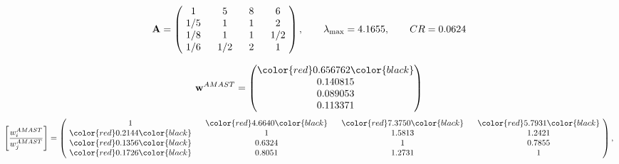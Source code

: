 \begin{example}
\begin{equation*}
\mathbf{A} =
\begin{pmatrix}
$\,\,$ 1 $\,\,$ & $\,\,$5$\,\,$ & $\,\,$8$\,\,$ & $\,\,$6 $\,\,$ \\
$\,\,$ 1/5$\,\,$ & $\,\,$ 1 $\,\,$ & $\,\,$1$\,\,$ & $\,\,$2 $\,\,$ \\
$\,\,$ 1/8$\,\,$ & $\,\,$ 1 $\,\,$ & $\,\,$ 1 $\,\,$ & $\,\,$ 1/2 $\,\,$ \\
$\,\,$ 1/6$\,\,$ & $\,\,$ 1/2$\,\,$ & $\,\,$2$\,\,$ & $\,\,$ 1  $\,\,$ \\
\end{pmatrix},
\qquad
\lambda_{\max} =
4.1655,
\qquad
CR = 0.0624
\end{equation*}

\begin{equation*}
\mathbf{w}^{AMAST} =
\begin{pmatrix}
\color{red} 0.656762\color{black} \\
0.140815\\
0.089053\\
0.113371
\end{pmatrix}\end{equation*}
\begin{equation*}
\left[ \frac{{w}^{AMAST}_i}{{w}^{AMAST}_j} \right] =
\begin{pmatrix}
$\,\,$ 1 $\,\,$ & $\,\,$\color{red} 4.6640\color{black} $\,\,$ & $\,\,$\color{red} 7.3750\color{black} $\,\,$ & $\,\,$\color{red} 5.7931\color{black} $\,\,$ \\
$\,\,$\color{red} 0.2144\color{black} $\,\,$ & $\,\,$ 1 $\,\,$ & $\,\,$1.5813$\,\,$ & $\,\,$1.2421  $\,\,$ \\
$\,\,$\color{red} 0.1356\color{black} $\,\,$ & $\,\,$0.6324$\,\,$ & $\,\,$ 1 $\,\,$ & $\,\,$0.7855 $\,\,$ \\
$\,\,$\color{red} 0.1726\color{black} $\,\,$ & $\,\,$0.8051$\,\,$ & $\,\,$1.2731$\,\,$ & $\,\,$ 1  $\,\,$ \\
\end{pmatrix},
\end{equation*}


\end{example}
